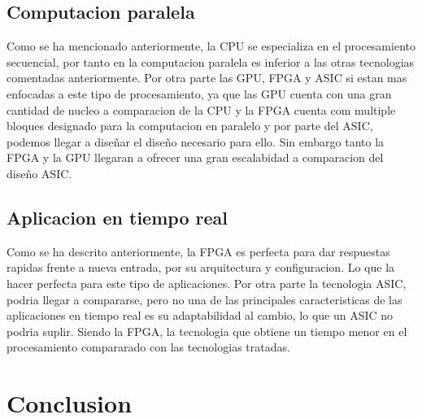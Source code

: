 \documentclass[11pt,spanish,listoffigures,listoftables]{tfgetsinf}
\begin{document}
   \subsection{Computacion paralela}

      Como se ha mencionado anteriormente, la CPU se especializa en el
      procesamiento secuencial, por tanto en la computacion paralela es inferior
      a las otras tecnologias comentadas anteriormente. Por otra parte las GPU,
      FPGA y ASIC si estan mas enfocadas a este tipo de procesamiento, ya que
      las GPU cuenta con una gran cantidad de nucleo a comparacion de la CPU y
      la FPGA cuenta com multiple bloques designado para la computacion en
      paralelo y por parte del ASIC, podemos llegar a diseñar el diseño
      necesario para ello.  Sin embargo tanto la FPGA y la GPU llegaran a
      ofrecer una gran escalabidad a comparacion del diseño ASIC.

   \subsection{Aplicacion en tiempo real}
      
      Como se ha descrito anteriormente, la FPGA es perfecta para dar respuestas
      rapidas frente a nueva entrada, por su arquitectura y configuracion. Lo
      que la hacer perfecta para este tipo de aplicaciones. Por otra parte la
      tecnologia ASIC, podria llegar a compararse, pero no una de las
      principales caracteristicas de las aplicaciones en tiempo real es su
      adaptabilidad al cambio, lo que un ASIC no podria suplir. Siendo la FPGA,
      la tecnologia que obtiene un tiempo menor en el procesamiento compararado
      con las tecnologias tratadas.

\section {Conclusion} %
   
\end{document}
